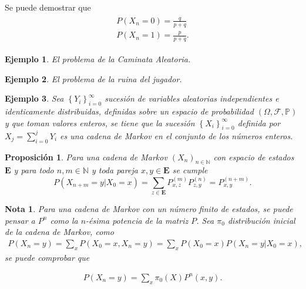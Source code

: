 \documentclass{article}
\newtheorem{Ejem}{Ejemplo}[section]
\newtheorem{Note}{Nota}%
\newtheorem{Prop}{Proposición}%
\newcommand{\nat}{\mathbb{N}}
\newcommand{\Eb}{\mathbf{E}}
\newcommand{\prob}{\mathbb{P}}
\numberwithin{equation}{section}
\begin{document}
Se puede demostrar que
\begin{eqnarray}
\begin{array}{l}
P\left(X_{n}=0\right)=\frac{q}{p+q}\\
P\left(X_{n}=1\right)=\frac{p}{p+q}.
\end{array}
\end{eqnarray}

\begin{Ejem}
El problema de la Caminata Aleatoria.
\end{Ejem}

\begin{Ejem}
El problema de la ruina del jugador.
\end{Ejem}

\begin{Ejem}
Sea $\left\{Y_{i}\right\}_{i=0}^{\infty}$ sucesi\'on de variables aleatorias independientes e identicamente distribuidas, definidas sobre un espacio de probabilidad $\left(\Omega,\mathcal{F},\prob\right)$ y que toman valores enteros, se tiene que la sucesi\'on $\left\{X_{i}\right\}_{i=0}^{\infty}$ definida por $X_{j}=\sum_{i=0}^{j}Y_{i}$ es una cadena de Markov en el conjunto de los n\'umeros enteros.
\end{Ejem}

\begin{Prop}
Para una cadena de Markov $\left(X_{n}\right)_{n\in\nat}$ con espacio de estados $\Eb$ y para todo $n,m\in \nat$ y toda pareja $x,y\in\Eb$ se cumple
\begin{equation}
P\left(X_{n+m}=y|X_{0}=x\right)=\sum_{z\in\Eb}P_{x,z}^{(m)}P_{z,y}^{(n)}=P_{x,y}^{(n+m)}.
\end{equation}
\end{Prop}

\begin{Note}
Para una cadena de Markov con un n\'umero finito de estados, se puede pensar a $P^{n}$ como la $n$-\'esima potencia de la matriz $P$. Sea $\pi_{0}$ distribuci\'on inicial de la cadena de Markov, como 
\begin{eqnarray}
P\left(X_{n}=y\right)=\sum_{x} P\left(X_{0}=x,X_{n}=y\right)=\sum_{x} P\left(X_{0}=x\right)P\left(X_{n}=y|X_{0}=x\right),
\end{eqnarray}
se puede comprobar que 

\begin{eqnarray}
P\left(X_{n}=y\right)=\sum_{x} \pi_{0}\left(X\right)P^{n}\left(x,y\right).
\end{eqnarray}
\end{Note}
\end{document}

